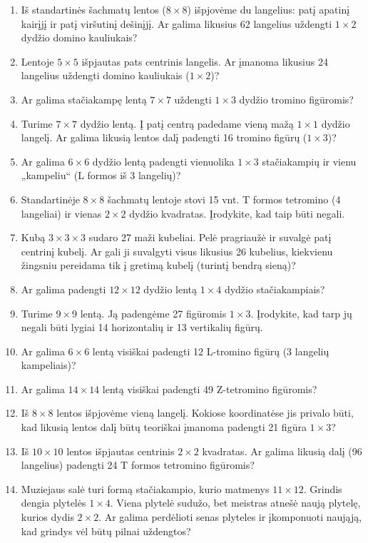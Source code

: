 \documentclass[11pt,a4paper]{scrartcl}
\begin{document}
\begin{enumerate}
    \renewcommand{\labelenumi}{\textbf{\theenumi.}}
    \item Iš standartinės šachmatų lentos ($8 \times 8$) išpjovėme du langelius: patį apatinį kairįjį ir patį viršutinį dešinįjį. Ar galima likusius 62 langelius uždengti $1 \times 2$ dydžio domino kauliukais?
    \item Lentoje $5 \times 5$ išpjautas pats centrinis langelis. Ar įmanoma likusius 24 langelius uždengti domino kauliukais ($1 \times 2$)?
    \item Ar galima stačiakampę lentą $7 \times 7$ uždengti $1 \times 3$ dydžio tromino figūromis?
    \item Turime $7 \times 7$ dydžio lentą. Į patį centrą padedame vieną mažą $1 \times 1$ dydžio langelį. Ar galima likusią lentos dalį padengti 16 tromino figūrų ($1 \times 3$)?
    \item Ar galima $6 \times 6$ dydžio lentą padengti vienuolika $1 \times 3$ stačiakampių ir vienu „kampeliu“ (L formos iš 3 langelių)?
    \item Standartinėje $8 \times 8$ šachmatų lentoje stovi 15 vnt. T formos tetromino (4 langeliai) ir vienas $2 \times 2$ dydžio kvadratas. Įrodykite, kad taip būti negali.
    \item Kubą $3 \times 3 \times 3$ sudaro 27 maži kubeliai. Pelė pragriaužė ir suvalgė patį centrinį kubelį. Ar gali ji suvalgyti visus likusius 26 kubelius, kiekvienu žingsniu pereidama tik į gretimą kubelį (turintį bendrą sieną)?
    \item Ar galima padengti $12 \times 12$ dydžio lentą $1 \times 4$ dydžio stačiakampiais?
    \item Turime $9 \times 9$ lentą. Ją padengėme 27 figūromis $1 \times 3$. Įrodykite, kad tarp jų negali būti lygiai 14 horizontalių ir 13 vertikalių figūrų.
    \item Ar galima $6 \times 6$ lentą visiškai padengti 12 L-tromino figūrų (3 langelių kampeliais)?
    \item Ar galima $14 \times 14$ lentą visiškai padengti 49 Z-tetromino figūromis?
    \item Iš $8 \times 8$ lentos išpjovėme vieną langelį. Kokiose koordinatėse jis privalo būti, kad likusią lentos dalį būtų teoriškai įmanoma padengti 21 figūra $1 \times 3$?
    \item Iš $10 \times 10$ lentos išpjautas centrinis $2 \times 2$ kvadratas. Ar galima likusią dalį (96 langelius) padengti 24 T formos tetromino figūromis?
    \item Muziejaus salė turi formą stačiakampio, kurio matmenys $11 \times 12$. Grindis dengia plytelės $1 \times 4$. Viena plytelė sudužo, bet meistras atnešė naują plytelę, kurios dydis $2 \times 2$. Ar galima perdėlioti senas plyteles ir įkomponuoti naująją, kad grindys vėl būtų pilnai uždengtos?

\end{enumerate}
\end{document}
